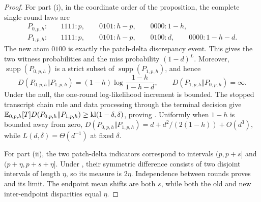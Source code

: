 \begin{proof}
For part (i), in the coordinate order of the proposition, the complete
single-round laws are
\begin{align}
P_{0,p,h}:&\quad
1111:p,\qquad 0101:h-p,\qquad 0000:1-h,
\label{eq:unknown-shared-null-atoms}\\
P_{1,p,h}:&\quad
1111:p,\qquad 0101:h-p,\qquad 0100:d,\qquad
0000:1-h-d.
\label{eq:unknown-shared-alt-atoms}
\end{align}
The new atom \(0100\) is exactly the patch-delta discrepancy event. This gives
the two witness probabilities and the miss probability \((1-d)^L\).
Moreover, \(\operatorname{supp}(P_{0,p,h})\) is a strict subset of
\(\operatorname{supp}(P_{1,p,h})\), and hence
\begin{equation}\label{eq:unknown-shared-kl-directions}
D(P_{0,p,h}\Vert P_{1,p,h})
=(1-h)\log\!\frac{1-h}{1-h-d},
\qquad
D(P_{1,p,h}\Vert P_{0,p,h})=\infty.
\end{equation}
Under the null, the one-round log-likelihood increment is bounded. The stopped
transcript chain rule and data processing through the terminal decision give
\(\mathbb{E}_{0,p,h}[T]D(P_{0,p,h}\Vert P_{1,p,h})\ge
\mathrm{kl}(1-\delta,\delta)\), proving .
Uniformly when \(1-h\) is bounded away from zero,
\(
D(P_{0,p,h}\Vert P_{1,p,h})=d+d^2/(2(1-h))+O(d^3)
\), while \(L(d,\delta)=\Theta(d^{-1})\) at fixed \(\delta\).

For part (ii), the two patch-delta indicators correspond to intervals
\((p,p+s]\) and \((p+\eta,p+s+\eta]\). Under
, their symmetric difference consists of two
disjoint intervals of length \(\eta\), so its measure is \(2\eta\).
Independence between rounds proves  and its
limit. The endpoint mean shifts are both \(s\), while both the old and new
inter-endpoint disparities equal \(\eta\).
\end{proof}
